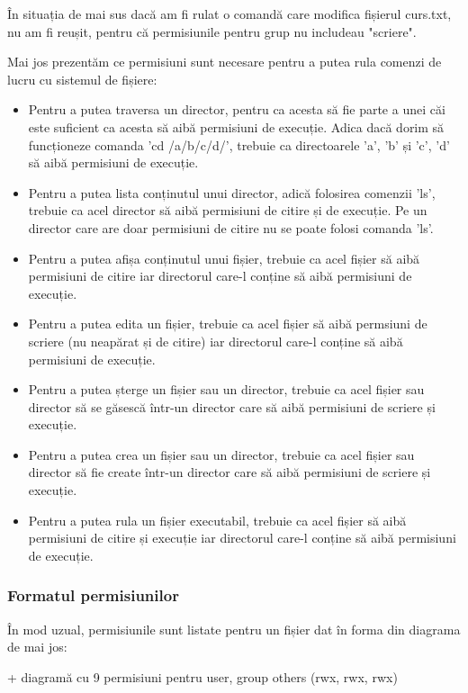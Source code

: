 În situația de mai sus dacă am fi rulat o comandă care modifica fișierul
curs.txt, nu am fi reușit, pentru că permisiunile pentru grup nu includeau
"scriere".

Mai jos prezentăm ce permisiuni sunt necesare pentru a putea rula comenzi de
lucru cu sistemul de fișiere:

\begin{itemize}
	\item Pentru a putea traversa un director, pentru ca acesta să fie parte
		a unei căi este suficient ca acesta să aibă permisiuni de
		execuție. Adica dacă dorim să funcționeze comanda 'cd
		/a/b/c/d/', trebuie ca directoarele 'a', 'b' și 'c', 'd' să aibă
		permisiuni de execuție.
	\item Pentru a putea lista conținutul unui director, adică folosirea
		comenzii 'ls', trebuie ca acel director să aibă permisiuni de
		citire și de execuție. Pe un director care are doar permisiuni
		de citire nu se poate folosi comanda 'ls'.
	\item Pentru a putea afișa conținutul unui fișier, trebuie ca acel
		fișier să aibă permisiuni de citire iar directorul care-l
		conține să aibă permisiuni de execuție.
	\item Pentru a putea edita un fișier, trebuie ca acel fișier să aibă
		permsiuni de scriere (nu neapărat și de citire) iar directorul
		care-l conține să aibă permisiuni de execuție.
	\item Pentru a putea șterge un fișier sau un director, trebuie ca acel
		fișier sau director să se găsescă într-un director care să aibă
		permisiuni de scriere și execuție.
	\item Pentru a putea crea un fișier sau un director, trebuie ca acel
		fișier sau director să fie create într-un director care să aibă
		permisiuni de scriere și execuție.
	\item Pentru a putea rula un fișier executabil, trebuie ca acel fișier
		să aibă permisiuni de citire și execuție iar directorul care-l
		conține să aibă permisiuni de execuție.
\end{itemize}

\subsubsection{Formatul permisiunilor}
\label{sec:users-fs-perms-format}

În mod uzual, permisiunile sunt listate pentru un fișier dat în forma din
diagrama de mai jos:

+ diagramă cu 9 permisiuni pentru user, group others (rwx, rwx, rwx)

